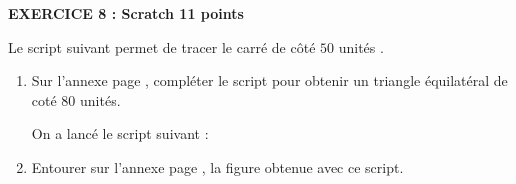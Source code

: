 \textbf{EXERCICE 8 : Scratch \hfill 11 points}

\medskip


Le script suivant permet de tracer le carré de côté $50$ unités .


\begin{center}
\begin{scratch}
{
}
\end{scratch}
\end{center}

\medskip

\begin{enumerate}
\item Sur l'annexe page \pageref{annexe2}, compléter le script pour obtenir un triangle équilatéral de coté $80$ unités.

\medskip

On a lancé le script suivant :

\begin{center}
\begin{scratch}
{
}
\end{scratch}
\end{center}
\item Entourer sur l'annexe page \pageref{annexe2}, la figure obtenue avec ce script.
\end{enumerate}

